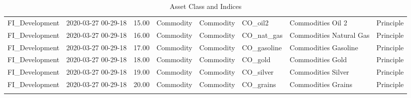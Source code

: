 \begin{longtable}{llrlllll}
  FI\_Development & 2020-03-27 00-29-18 & 15.00 & Commodity & Commodity & CO\_oil2 & Commodities Oil 2 & Principle \\ 
  FI\_Development & 2020-03-27 00-29-18 & 16.00 & Commodity & Commodity & CO\_nat\_gas & Commodities Natural Gas & Principle \\ 
  FI\_Development & 2020-03-27 00-29-18 & 17.00 & Commodity & Commodity & CO\_gasoline & Commodities Gasoline & Principle \\ 
  FI\_Development & 2020-03-27 00-29-18 & 18.00 & Commodity & Commodity & CO\_gold & Commodities Gold & Principle \\ 
  FI\_Development & 2020-03-27 00-29-18 & 19.00 & Commodity & Commodity & CO\_silver & Commodities Silver & Principle \\ 
  FI\_Development & 2020-03-27 00-29-18 & 20.00 & Commodity & Commodity & CO\_grains & Commodities Grains & Principle \\ 
   \hline
\hline
\caption{Asset Class and Indices} 
\end{longtable}
